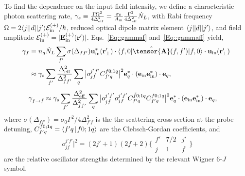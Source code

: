\documentclass[preprint, aps,pra,onecolumn]{revtex4-1} %
\newcommand{\inp}{{\rm in}}
\begin{document}
\begin{appendix}
To find the dependence on the input field intensity, we define a characteristic photon scattering rate, $\gamma_s \equiv \frac{\Gamma\Omega^2}{4\Delta_{\rm eff}^2}= \frac{\sigma_0}{A_{\rm in}}\frac{\Gamma^2}{4 \Delta_\eff^2} \dot{N}_L $, with Rabi frequency $ \Omega=2\bra{j}|d|\ket{j'}\mathcal{E}^{(+)}_{\rm in}/\hbar $, reduced optical dipole matrix element $\bra{j}|d|\ket{j'}$, and field amplitude $ \mathcal{E}^{(+)}_{\rm in}=|\mathbf{E}_{\rm in}^{(+)}(\br')| $.
Eqs.~\eqref{Eq::gammaf} and~\eqref{Eq::gammaff} yield,
\begin{subequations}
	\begin{align}
		\gamma_f &=n_g\dot{N}_L  \sum_{f'} \sigma (\Delta_{ff'} ) \mathbf{u}^*_\inp(\br'_\perp)\cdot \bra{f,0} \hat{\tensor{\mbf{A}}}(f,f') \ket{f,0}  \cdot \mathbf{u}_\inp(\br'_\perp)\\
		&\approx  \gamma_s \sum_{f'} \frac{\Delta_{\rm eff}^2}{\Delta_{ff'}^2}\sum_q \big| o_{jf}^{j'f'}C_{f'q}^{f0;1 q} \big|^2 \mathbf{e}_q^* \cdot (\mathbf{e}_{\rm in}\mathbf{e}_{\rm in}^* )\cdot \mathbf{e}_q, 
	\end{align}
\end{subequations}
	\begin{align}
		\gamma_{f \rightarrow \tilde{f}} 
		&\approx \gamma_s \sum_{f'} \frac{\Delta_{\rm eff}^2}{\Delta_{ff'}^2}\sum_q \big| o_{j\tilde{f}}^{j'f'} o_{jf}^{j'f'}C_{f'q}^{\tilde{f}0;1 q}C_{f'q}^{f0;1q} \big|^2 \mathbf{e}_q^* \cdot (\mathbf{e}_{\rm in}\mathbf{e}_{\rm in}^* )\cdot \mathbf{e}_q,
	\end{align}
where $ \sigma (\Delta_{ff'} )  = \sigma_0 \Gamma^2/4\Delta^2_{f' f}$ is the the scattering cross section at the probe detuning, $ C_{f'q}^{f0;1 q}=\Braket{f'q}{f0;1q}$ are the Clebsch-Gordan coefficients, and
\begin{equation}
\big| o_{jf}^{j'f'} \big|^2=(2j'+1)(2f+2) \bigg\{
\begin{array}{ccc}
f' & 7/2 & j' \\
 j & 1 & f 
 \end{array}
 \bigg\}
\end{equation}
are the relative oscillator strengths determined by the relevant Wigner 6-$J$ symbol.


\end{appendix}
\end{document}

